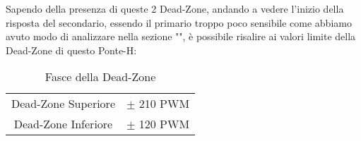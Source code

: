 \begin{enumerate}
\end{enumerate}
\noindent
Sapendo della presenza di queste 2 Dead-Zone, andando a vedere l'inizio della risposta del secondario, essendo il primario troppo poco sensibile come abbiamo avuto modo di analizzare nella sezione "", è possibile risalire ai valori limite della Dead-Zone di questo Ponte-H:
\begin{table}[H]
	\centering
	\caption[Fasce della Dead-Zone]{Fasce della Dead-Zone}
	\begin{tabular}[t]{||c r||}
		\hline
		Dead-Zone Superiore & $\pm$ 210 PWM  \\
		Dead-Zone Inferiore & $\pm$ 120  PWM \\
		\hline
	\end{tabular}
\end{table}